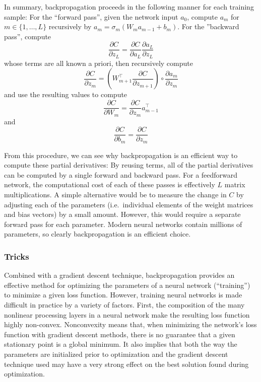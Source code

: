 In summary, backpropagation proceeds in the following manner for each training sample: For the ``forward pass'', given the network input $a_0$, compute $a_m$ for $m \in \{1, \ldots, L\}$ recursively by $a_m = \sigma_m(W_m a_{m - 1} + b_m)$.
For the ''backward pass'', compute
\begin{equation}
\frac{\partial C}{\partial z_L} = \frac{\partial C}{\partial a_L} \frac{\partial a_L}{\partial z_L}
\end{equation}
whose terms are all known a priori, then recursively compute
\begin{equation}
\frac{\partial C}{\partial z_m} = \left(W_{m + 1}^\top \frac{\partial C}{\partial z_{m + 1}}\right) \circ \frac{\partial a_m}{\partial z_m}
\end{equation}
and use the resulting values to compute
\begin{equation}
\frac{\partial C}{\partial W_m} = \frac{\partial C}{\partial z_m} a_{m - 1}^\top
\end{equation}
and
\begin{equation}
\frac{\partial C}{\partial b_m} = \frac{\partial C}{\partial z_m}
\end{equation}

From this procedure, we can see why backpropagation is an efficient way to compute these partial derivatives: By reusing terms, all of the partial derivatives can be computed by a single forward and backward pass.
For a feedforward network, the computational cost of each of these passes is effectively $L$ matrix multiplications.
A simple alternative would be to measure the change in $C$ by adjusting each of the parameters (i.e.\ individual elements of the weight matrices and bias vectors) by a small amount.
However, this would require a separate forward pass for each parameter.
Modern neural networks contain millions of parameters, so clearly backpropagation is an efficient choice.

\subsubsection{Tricks}

Combined with a gradient descent technique, backpropagation provides an effective method for optimizing the parameters of a neural network (``training'') to minimize a given loss function.
However, training neural networks is made difficult in practice by a variety of factors.
First, the composition of the many nonlinear processing layers in a neural network make the resulting loss function highly non-convex.
Nonconvexity means that, when minimizing the network's loss function with gradient descent methods, there is no guarantee that a given stationary point is a global minimum.
It also implies that both the way the parameters are initialized prior to optimization and the gradient descent technique used may have a very strong effect on the best solution found during optimization.

